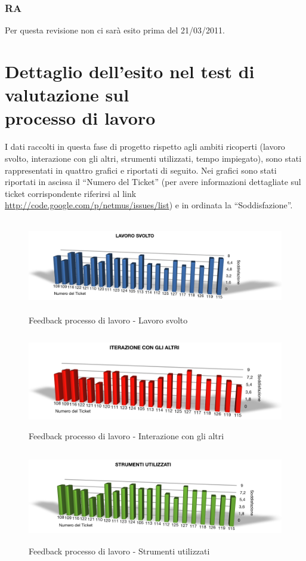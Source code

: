 \subsubsection*{RA}
Per questa revisione non ci sar\`a esito prima del 21/03/2011.

\section{Dettaglio dell'esito nel test di valutazione sul\\ processo di lavoro}
I dati raccolti in questa fase di progetto rispetto agli ambiti ricoperti
(lavoro svolto, interazione con gli altri, strumenti utilizzati, tempo
impiegato), sono stati rappresentati in quattro grafici e riportati di seguito.
Nei grafici sono stati riportati in ascissa il ``Numero del Ticket'' (per avere
informazioni dettagliate sul ticket corrispondente riferirsi al link
\url{http://code.google.com/p/netmus/issues/list}) e in ordinata la
``Soddisfazione''.

\begin{figure}[htbp]
  \centering
  \includegraphics[height=4.1cm]{img/PQ/LavoroSvolto.png}
\caption{Feedback processo di lavoro - Lavoro svolto}
\end{figure}

\begin{figure}[htbp]
  \centering
  \includegraphics[height=4.1cm]{img/PQ/IterazioneConGliAltri.png}
\caption{Feedback processo di lavoro - Interazione con gli altri}
\end{figure}

\begin{figure}[htbp]
  \centering
  \includegraphics[height=4.1cm]{img/PQ/Strumenti.png}
\caption{Feedback processo di lavoro - Strumenti utilizzati}
\end{figure}

